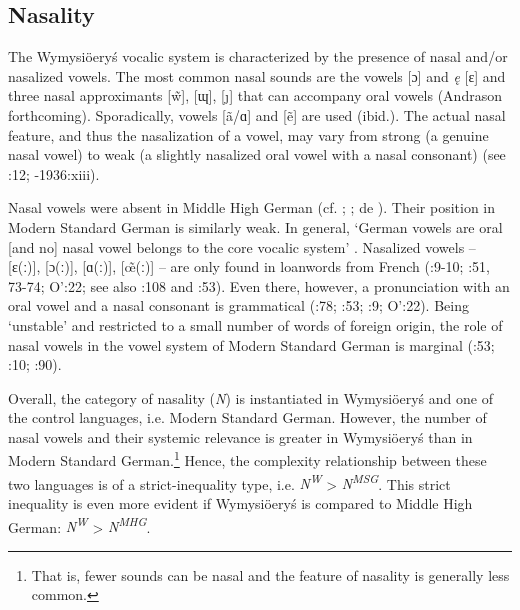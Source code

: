 \documentclass[output=paper]{langscibook}
\begin{document}
\subsection{Nasality}\label{sec:wymsorys:3.6}


The Wymysiöeryś vocalic system is characterized by the presence of nasal and/or nasalized vowels. The most common nasal sounds are the vowels [ɔ] and \textit{ę} [ɛ] and three nasal approximants [\~{w}], [ɰ], [ȷ] that can accompany oral vowels (Andrason forthcoming). Sporadically, vowels [ã/ɑ] and [ẽ] are used (ibid.). The actual nasal feature, and thus the nasalization of a vowel, may vary from strong (a genuine nasal vowel) to weak (a slightly nasalized oral vowel with a nasal consonant) (see \citealt{Kleczkowski1920}:12; \citealt{Moimir1930}-1936:xiii).


Nasal vowels were absent in Middle High German (cf. \citealt{Wright1917}; \citealt{Paul2007}; de \citealt{BoorWisniewski1973}). Their position in Modern Standard German is similarly weak. In general, ‘German vowels are oral [and no] nasal vowel belongs to the core vocalic system’ \citep[71]{Caratini2009}. Nasalized vowels – [ɛ(ː)], [ɔ(ː)], [ɑ(ː)], [\~{œ}(ː)] – are only found in loanwords from French (\citealt{Fagan2009}:9-10; \citealt{Caratini2009}:51, 73-74; O’\citealt{BrienFagan2016}:22; see also \citealt{Russ1994}:108 and \citealt{Fox2005}:53). Even there, however, a pronunciation with an oral vowel and a nasal consonant is grammatical (\citealt{Russ1994}:78; \citealt{Fox2005}:53; \citealt{Fagan2009}:9; O’\citealt{BrienFagan2016}:22). Being ‘unstable’ and restricted to a small number of words of foreign origin, the role of nasal vowels in the vowel system of Modern Standard German is marginal (\citealt{Fox2005}:53; \citealt{Fagan2009}:10; \citealt{JohnsonBraber2008}:90). 

Overall, the category of nasality (\textit{N}) is instantiated in Wymysiöeryś and one of the control languages, i.e. Modern Standard German. However, the number of nasal vowels and their systemic relevance is greater in Wymysiöeryś than in Modern Standard German.\footnote{That is, fewer sounds can be nasal and the feature of nasality is generally less common.} Hence, the complexity relationship between these two languages is of a strict-inequality type, i.e. \textit{N\textsuperscript{W}} > \textit{N\textsuperscript{MSG}}. This strict inequality is even more evident if Wymysiöeryś is compared to Middle High German: \textit{N\textsuperscript{W}} > \textit{N\textsuperscript{MHG}}.
\end{document}
